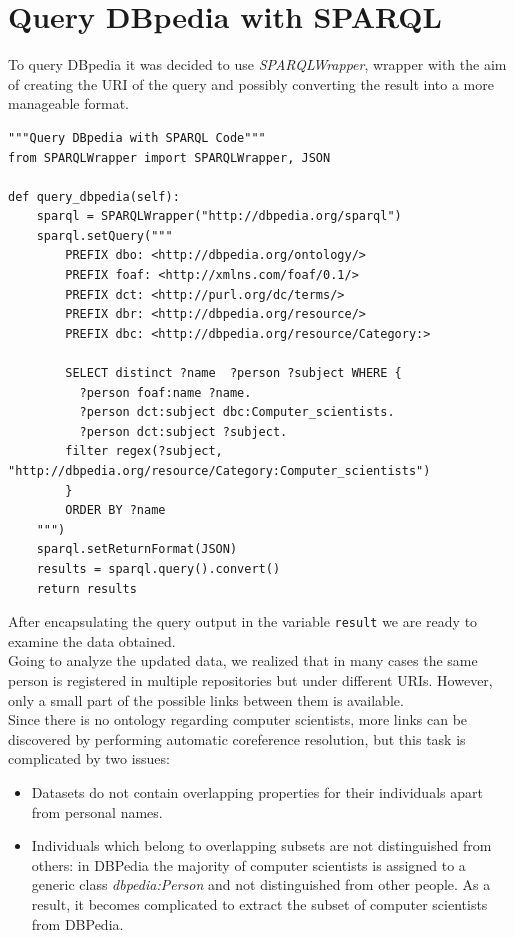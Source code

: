 \documentclass[12pt, twoside]{article}
\begin{document}
\section{Query DBpedia with SPARQL}
To query DBpedia it was decided to use \textit{SPARQLWrapper}, wrapper with the aim of creating the URI of the query and possibly converting the result into a more manageable format.
\vspace{6pt}
\begin{lstlisting}[caption={Query DBpedia},captionpos=b,language=iPython]
"""Query DBpedia with SPARQL Code"""
from SPARQLWrapper import SPARQLWrapper, JSON

def query_dbpedia(self):
    sparql = SPARQLWrapper("http://dbpedia.org/sparql")
    sparql.setQuery("""
        PREFIX dbo: <http://dbpedia.org/ontology/>
        PREFIX foaf: <http://xmlns.com/foaf/0.1/>
        PREFIX dct: <http://purl.org/dc/terms/>
        PREFIX dbr: <http://dbpedia.org/resource/>
        PREFIX dbc: <http://dbpedia.org/resource/Category:>

        SELECT distinct ?name  ?person ?subject WHERE {
          ?person foaf:name ?name. 
          ?person dct:subject dbc:Computer_scientists.  
          ?person dct:subject ?subject.
        filter regex(?subject, "http://dbpedia.org/resource/Category:Computer_scientists")
        }
        ORDER BY ?name
    """)
    sparql.setReturnFormat(JSON)
    results = sparql.query().convert()
    return results
\end{lstlisting}
After encapsulating the query output in the variable \lstinline[language = iPython]{result} we are ready to examine the data obtained.\\
Going to analyze the updated data, we realized that in many cases the same person is registered in multiple repositories but under different URIs. However, only a small part of the possible links between them is available.\\
Since there is no ontology regarding computer scientists, more links can be discovered by performing automatic coreference resolution, but this task is complicated by two issues:
\begin{itemize}[noitemsep, topsep=0pt]
	\item Datasets do not contain overlapping properties for their individuals apart from personal names.
	\item 	Individuals which belong to overlapping subsets are not distinguished from others: in DBPedia the majority of computer scientists is assigned to a generic class \textit{dbpedia:Person} and not distinguished from other people. As a result, it becomes complicated to extract the subset of computer scientists from DBPedia.
\end{itemize}
\end{document}

